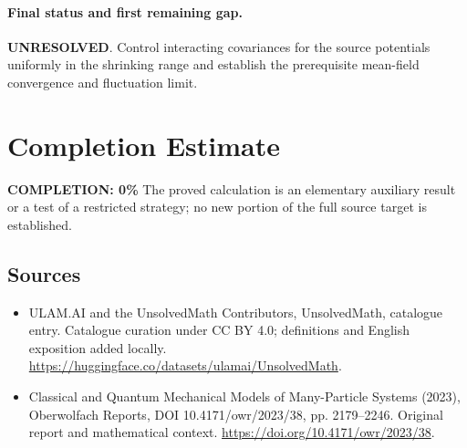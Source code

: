 \documentclass[11pt]{article}
\begin{document}
\paragraph{Final status and first remaining gap.}
\textbf{UNRESOLVED}. Control interacting covariances for the source potentials uniformly in the shrinking range and establish the prerequisite mean-field convergence and fluctuation limit.

\section{Completion Estimate}
\noindent\textbf{COMPLETION: 0\%}
The proved calculation is an elementary auxiliary result or a test of a restricted strategy; no new portion of the full source target is established.

\subsection{Sources}
\begin{itemize}
\item[\hypertarget{source:statement:1}{S1}] ULAM.AI and the UnsolvedMath Contributors, UnsolvedMath, catalogue entry. Catalogue curation under CC BY 4.0; definitions and English exposition added locally.
\url{https://huggingface.co/datasets/ulamai/UnsolvedMath}.
\item[\hypertarget{source:statement:2}{S2}] Classical and Quantum Mechanical Models of Many-Particle Systems (2023), Oberwolfach Reports, DOI 10.4171/owr/2023/38, pp. 2179--2246. Original report and mathematical context.
\url{https://doi.org/10.4171/owr/2023/38}.
\end{itemize}
\label{end:statement}
\end{document}
